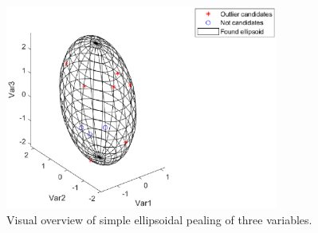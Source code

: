 \documentclass[twoside,a4paper]{refart}
\begin{document}
\begin{figure}[H]
\begin{center}
\includegraphics[width = 0.8\textwidth]{ep3d}
\end{center}
\caption{Visual overview of simple ellipsoidal pealing of three variables.}
\label{fig:3d}
\end{figure}

\printindex
\end{document}
